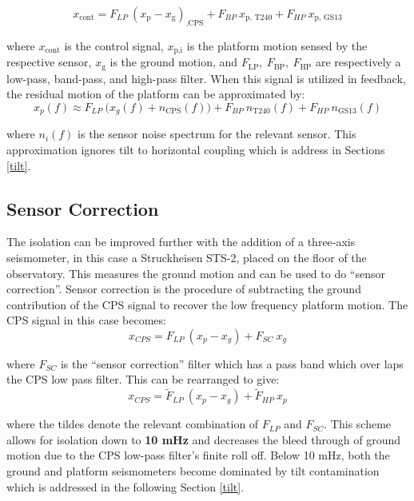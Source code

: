 \documentclass [12pt, proquest]{uwthesis}[2019]
\begin{document}
\begin{equation}
x_\text{cont}=F_{LP}\ (x_\text{p}-x_\text{g})_\text{,CPS}+F_{BP}\ x_\text{p, T240}+F_{HP}\ x_\text{p, GS13}
\end{equation}

where $x_\text{cont}$ is the control signal, $x_\text{p,i}$ is the platform motion sensed by the respective sensor, $x_\text{g}$ is the ground motion, and $F_\text{LP},\  F_\text{BP},\ F_\text{HP}$ are respectively a low-pass, band-pass, and high-pass filter. When this signal is utilized in feedback, the residual motion of the platform can be approximated by:
\begin{equation}
x_p(f)\approx F_{LP}\ \big(x_g(f)+n_\text{CPS}(f)\big)+F_{BP}\ n_\text{T240}(f)+F_{HP}\ n_\text{GS13}(f)
\end{equation}

where $n_{i}(f)$ is the sensor noise spectrum for the relevant sensor. This approximation ignores tilt to horizontal coupling which is address in Sections \ref{tilt}.

\subsection{Sensor Correction}

The isolation can be improved further with the addition of a three-axis seismometer, in this case a Struckheisen STS-2, placed on the floor of the observatory. This measures the ground motion and can be used to do ``sensor correction''. Sensor correction is the procedure of subtracting the ground contribution of the CPS signal to recover the low frequency platform motion. The CPS signal in this case becomes:
\begin{equation}
x_{CPS}=F_{LP}\ (x_p-x_g)+F_{SC}\ x_g
\end{equation}

where $F_{SC}$ is the ``sensor correction'' filter which has a pass band which over laps the CPS low pass filter. This can be rearranged to give:
\begin{equation}
x_{CPS}=\tilde F_{LP}\ (x_p-x_g)+\tilde F_{HP}\ x_p
\end{equation}

where the tildes denote the relevant combination of $F_{LP}$ and $F_{SC}$. This scheme allows for isolation down to \textbf{10 mHz} and decreases the bleed through of ground motion due to the CPS low-pass filter's finite roll off. Below 10 mHz, both the ground and platform seismometers become dominated by tilt contamination which is addressed in the following Section \ref{tilt}.
\end{document}
